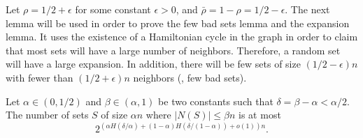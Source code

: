 \documentclass{toc}
\theoremstyle{plain}
\begin{document}
Let %
$\rho= 1/2 +\epsilon$  %
for some constant $\epsilon>0$,
and %
%
$\bar{\rho}=1-\rho= 1/2-\epsilon$. 
The next lemma will be used in order to prove the few bad sets lemma and the expansion lemma. It uses the existence 
of  %
a Hamiltonian cycle in the graph in order to claim that most sets will have a large number of neighbors. Therefore, a random set will have a large expansion. In addition, there will be few sets of size 
%
$(1/2-\epsilon)n$    %
with %
fewer than %
%
$(1/2+\epsilon)n$   %
neighbors (\ie, %
%
few bad sets).

\begin{lemma}
	Let $\alpha\in (0, 1/2)$ and $\beta \in (\alpha, 1)$ be two constants such that $\delta=\beta-\alpha < \alpha/2$. The number of sets $S$ of size $\alpha n$ where $|N(S)|\leq \beta n$ is at most $$2^{(\alpha H(\delta/ \alpha)+(1-\alpha)H(\delta/(1-\alpha))+o(1))n}.$$
	\label{lem:ham_alpha_beta}
\end{lemma}
\end{document}
